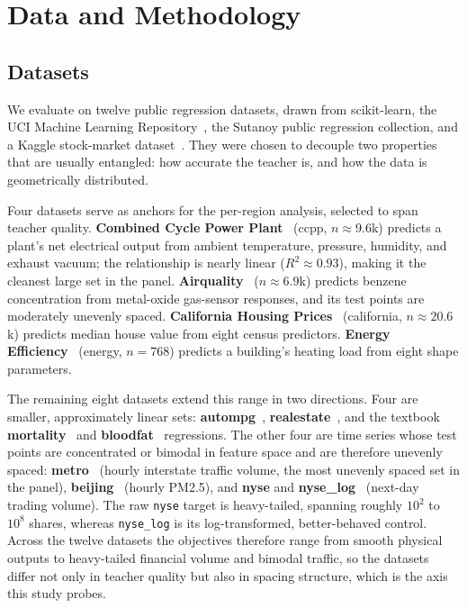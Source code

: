 \section{Data and Methodology}
\label{sec:method}

\subsection{Datasets}
\label{sec:data}

We evaluate on twelve public regression datasets, drawn from scikit-learn, the UCI Machine
Learning Repository~\cite{uci_repository}, the Sutanoy public regression collection, and a
Kaggle stock-market dataset~\cite{gawlik2016nyse}. They were chosen to decouple two
properties that are usually entangled: how accurate the teacher is, and how the data is
geometrically distributed.

Four datasets serve as anchors for the per-region analysis, selected to span teacher
quality. \textbf{Combined Cycle Power Plant}~\cite{tufekci2014ccpp} (ccpp,
$n\!\approx\!9.6$k) predicts a plant's net electrical output from ambient temperature,
pressure, humidity, and exhaust vacuum; the relationship is nearly linear
($R^2\!\approx\!0.93$), making it the cleanest large set in the panel.
\textbf{Airquality}~\cite{devito2008airquality} ($n\!\approx\!6.9$k) predicts benzene
concentration from metal-oxide gas-sensor responses, and its test points are moderately
unevenly spaced. \textbf{California Housing Prices}~\cite{pace1997california} (california, $n\!\approx\!20.6$k)
predicts median house value from eight census predictors.
\textbf{Energy Efficiency}~\cite{tsanas2012energy} (energy, $n\!=\!768$) predicts a
building's heating load from eight shape parameters.

The remaining eight datasets extend this range in two directions. Four are smaller,
approximately linear sets: \textbf{autompg}~\cite{quinlan1993autompg},
\textbf{realestate}~\cite{yeh2018realestate}, and the textbook
\textbf{mortality}~\cite{mcdonald1973mortality} and
\textbf{bloodfat}~\cite{sutanoy_datasets} regressions. The other four are time series whose
test points are concentrated or bimodal in feature space and are therefore unevenly spaced:
\textbf{metro}~\cite{uci_repository} (hourly interstate traffic volume, the most unevenly
spaced set in the panel), \textbf{beijing}~\cite{liang2015beijing} (hourly PM2.5), and
\textbf{nyse} and \textbf{nyse\_log}~\cite{gawlik2016nyse} (next-day trading volume). The raw \texttt{nyse} target is heavy-tailed, spanning roughly
$10^2$ to $10^8$ shares, whereas \texttt{nyse\_log} is its log-transformed, better-behaved
control. Across the twelve datasets the objectives therefore range from smooth physical
outputs to heavy-tailed financial volume and bimodal traffic, so the datasets differ not
only in teacher quality but also in spacing structure, which is the axis this study probes.

